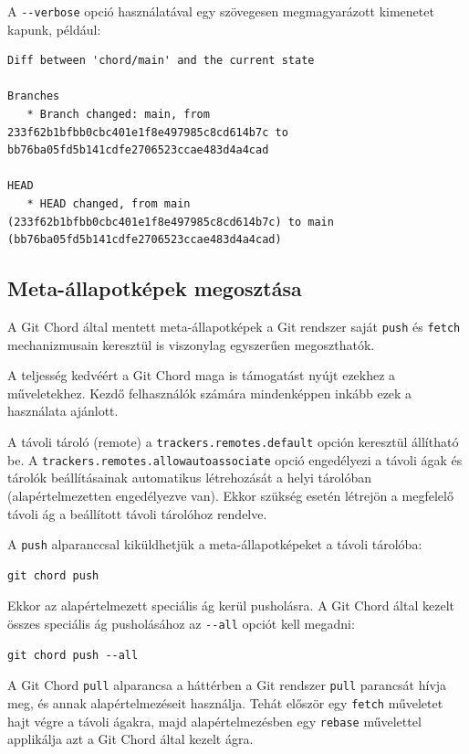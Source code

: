 \documentclass[
]{elteikthesis}[2025/03/25]
\begin{document}
A \verb|--verbose| opció használatával egy szövegesen megmagyarázott kimenetet kapunk, például:

\begin{verbatim}
Diff between 'chord/main' and the current state

Branches
   * Branch changed: main, from 233f62b1bfbb0cbc401e1f8e497985c8cd614b7c to bb76ba05fd5b141cdfe2706523ccae483d4a4cad

HEAD
   * HEAD changed, from main (233f62b1bfbb0cbc401e1f8e497985c8cd614b7c) to main (bb76ba05fd5b141cdfe2706523ccae483d4a4cad)
\end{verbatim}

\subsection{Meta-állapotképek megosztása}


A Git Chord által mentett meta-állapotképek a Git rendszer saját \verb|push| és \verb|fetch|
mechanizmusain keresztül is viszonylag egyszerűen megoszthatók.

A teljesség kedvéért a Git Chord maga is támogatást nyújt ezekhez a műveletekhez.
Kezdő felhasználók számára mindenképpen inkább ezek a használata ajánlott.

A távoli tároló (remote) a \verb|trackers.remotes.default| opción keresztül állítható be.
A \verb|trackers.remotes.allowautoassociate| opció engedélyezi a távoli ágak és tárolók beállításainak
automatikus létrehozását a helyi tárolóban (alapértelmezetten engedélyezve van).
Ekkor szükség esetén létrejön a megfelelő távoli ág a beállított távoli tárolóhoz rendelve.

A \verb|push| alparanccsal kiküldhetjük a meta-állapotképeket a távoli tárolóba:

\begin{verbatim}
git chord push
\end{verbatim}

Ekkor az alapértelmezett speciális ág kerül pusholásra.
A Git Chord által kezelt összes speciális ág pusholásához
az \verb|--all| opciót kell megadni:

\begin{verbatim}
git chord push --all
\end{verbatim}

A Git Chord \verb|pull| alparancsa a háttérben a Git rendszer \verb|pull| parancsát hívja meg,
és annak alapértelmezéseit használja.
Tehát először egy \verb|fetch| műveletet hajt végre a távoli ágakra,
majd alapértelmezésben egy \verb|rebase| művelettel applikálja azt a Git Chord által kezelt ágra.
\end{document}
